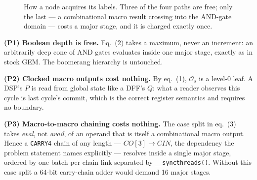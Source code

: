 \documentclass[11pt]{article}
\newcommand{\code}[1]{\texttt{\small #1}}
\begin{document}
\begin{figure}[h]\centering
{}
\caption{How a node acquires its labels. Three of the four paths are free; only the
last --- a combinational macro result crossing into the AND-gate domain --- costs a
major stage, and it is charged exactly once.}
\label{fig:labels}
\end{figure}

\textbf{(P1) Boolean depth is free.} Eq.~(2) takes a maximum, never an increment: an
arbitrarily deep cone of AND gates evaluates inside one major stage, exactly as in
stock GEM. The boomerang hierarchy is untouched.

\textbf{(P2) Clocked macro outputs cost nothing.} By eq.~(1), $\mathcal{O}_s$ is a
level-0 leaf. A DSP's $P$ is read from global state like a DFF's $Q$: what a reader
observes this cycle is last cycle's commit, which is the correct register semantics
and requires no boundary.

\textbf{(P3) Macro-to-macro chaining costs nothing.} The case split in eq.~(3) takes
\emph{eval}, not \emph{avail}, of an operand that is itself a combinational macro
output. Hence a \code{CARRY4} chain of any length --- $CO[3]\!\to\!CIN$, the
dependency the problem statement names explicitly --- resolves inside a single major
stage, ordered by one batch per chain link separated by \code{\_\_syncthreads()}.
Without this case split a 64-bit carry-chain adder would demand 16 major stages.
\end{document}
